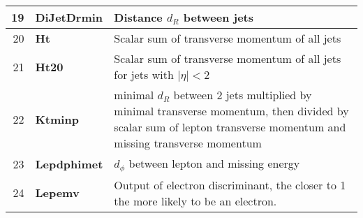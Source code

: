 \begin{table}[htbp]
\begin{tabular}{|rl p{}|}
19 & \textbf{DiJetDrmin} &  Distance $d_R$ between jets \\ \hline
20 & \textbf{Ht} &  Scalar sum of transverse momentum of all jets \\ \hline
21 & \textbf{Ht20} & Scalar sum of transverse momentum of all jets for jets with $|\eta| < 2$ \\ \hline
22 & \textbf{Ktminp} &  minimal $d_R$ between 2 jets multiplied by minimal transverse momentum, then divided by scalar sum of lepton transverse momentum and missing transverse momentum \\ \hline
23 & \textbf{Lepdphimet} &  $d_\phi$ between lepton and missing energy \\ \hline
24 & \textbf{Lepemv} &  Output of electron discriminant, the closer to 1 the more likely to be an electron. \\ \hline
\end{tabular}
\label{tab:app-vars}
\end{table}
